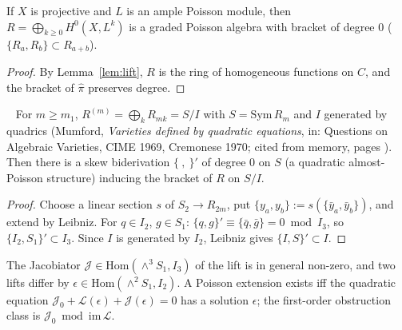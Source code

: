 \begin{prop}\tP\label{prop:graded}
If $X$ is projective and $L$ is an ample Poisson module, then $R=\bigoplus_{k\ge0}H^0(X,L^k)$ is a graded Poisson algebra with bracket of degree $0$ ($\{R_a,R_b\}\subset R_{a+b}$).
\end{prop}
\begin{proof}
By Lemma~\ref{lem:lift}, $R$ is the ring of homogeneous functions on $C$, and the bracket of $\hat\pi$ preserves degree.\qedhere
\end{proof}
\begin{prop}\tP\ \tC\label{prop:almost}
For $m\ge m_1$, $R^{(m)}=\bigoplus_kR_{mk}=S/I$ with $S=\mathrm{Sym}\,R_m$ and $I$ generated by quadrics (Mumford, \emph{Varieties defined by quadratic equations}, in: Questions on Algebraic Varieties, CIME 1969, Cremonese 1970; cited from memory, pages \tQ). Then there is a skew biderivation $\{\ ,\ \}'$ of degree $0$ on $S$ (a quadratic almost-Poisson structure) inducing the bracket of $R$ on $S/I$.
\end{prop}
\begin{proof}
Choose a linear section $s$ of $S_2\to R_{2m}$, put $\{y_a,y_b\}:=s(\{\bar y_a,\bar y_b\})$, and extend by Leibniz. For $q\in I_2$, $g\in S_1$: $\{q,g\}'\equiv\{\bar q,\bar g\}=0\bmod I_3$, so $\{I_2,S_1\}'\subset I_3$. Since $I$ is generated by $I_2$, Leibniz gives $\{I,S\}'\subset I$.\qedhere
\end{proof}
\noindent The Jacobiator $\mathcal J\in\mathrm{Hom}(\wedge^3S_1,I_3)$ of the lift is in general non-zero, and two lifts differ by $\epsilon\in\mathrm{Hom}(\wedge^2S_1,I_2)$. A Poisson extension exists iff the quadratic equation $\mathcal J_0+\mathcal L(\epsilon)+\mathcal J(\epsilon)=0$ has a solution $\epsilon$; the first-order obstruction class is $\mathcal J_0\bmod\mathrm{im}\,\mathcal L$.

